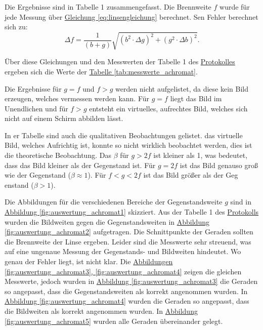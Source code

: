 Die Ergebnisse sind in Tabelle 1 zusammengefasst. Die Brennweite $f$ wurde für jede Messung über \hyperref[eq:linsengleichung]{Gleichung \ref*{eq:linsengleichung}} berechnet. Sen Fehler berechnet sich zu:
\begin{equation}
    \Delta f = \frac{1}{(b+g)}\sqrt{\left(b^2 \cdot \Delta g\right)^2 + \left(g^2 \cdot \Delta b\right)^2}.
\end{equation}

Über diese Gleichungen und den Messwerten der Tabelle 1 des \hyperref[Protokoll]{Protokolles} ergeben sich die Werte der \hyperref[tab:messwerte_achromat]{Tabelle \ref*{tab:messwerte_achromat}}.

Die Ergebnisse für $g=f$ und $f>g$  werden nicht aufgelistet, da diese kein Bild erzeugen, welches vermessen werden kann. Für $g=f$ liegt das Bild im Unendlichen und für $f>g$ entsteht ein virtuelles, aufrechtes Bild, welches sich nicht auf einem Schirm abbilden lässt.

In er Tabelle sind auch die qualitativen Beobachtungen gelistet. das virtuelle Bild, welches Aufrichtig ist, konnte so nicht wirklich beobachtet werden, dies ist die theoretische Beobachtung. Das $\beta$ für $g > 2f$ ist kleiner als 1, was bedeutet, dass das Bild kleiner als der Gegenstand ist. Für $g = 2f$ ist das Bild genauso groß wie der Gegenstand ($\beta \approx 1$). Für $f < g < 2f$ ist das Bild größer als der Geg enstand ($\beta > 1$).

Die Abbildungen für die verschiedenen Bereiche der Gegenstandsweite $g$ sind in \hyperref[fig:auswertung_achromat1]{Abbildung \ref*{fig:auswertung_achromat1}} skizziert. 
Aus der Tabelle 1 des \hyperref[Protokoll]{Protokolls} wurden die Bildweiten gegen die Gegenstandsweiten in \hyperref[fig:auswertung_achromat2]{Abbildung \ref*{fig:auswertung_achromat2}} aufgetragen. Die Schnittpunkte der Geraden sollten die Brennweite der Linse ergeben. Leider sind die Messwerte sehr streuend, was auf eine ungenaue Messung der Gegenstands- und Bildweiten hindeutet. Wo genau der Fehler liegt, ist nicht klar. Die \hyperref[fig:auswertung_achromat3]{Abbildungen \ref*{fig:auswertung_achromat3}, \ref*{fig:auswertung_achromat4}} zeigen die gleichen Messwerte, jedoch wurden in \hyperref[fig:auswertung_achromat3]{Abbildung \ref*{fig:auswertung_achromat3}} die Geraden so angepasst, dass die Gegenstandsweiten als korrekt angenommen wurden. In \hyperref[fig:auswertung_achromat4]{Abbildung \ref*{fig:auswertung_achromat4}} wurden die Geraden so angepasst, dass die Bildweiten als korrekt angenommen wurden. In \hyperref[fig:auswertung_achromat5]{Abbildung \ref*{fig:auswertung_achromat5}} wurden alle Geraden übereinander gelegt. 

